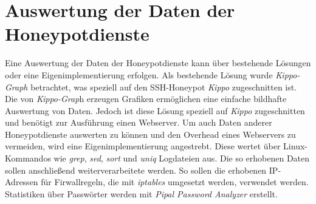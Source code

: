 \section{Auswertung der Daten der Honeypotdienste}
\label{sec:Auswertung der Daten der Honeypotdienste}

Eine Auswertung der Daten der Honeypotdienste kann über bestehende Lösungen oder eine Eigenimplementierung erfolgen. Als bestehende Lösung wurde \textit{Kippo-Graph} betrachtet, was speziell auf den SSH-Honeypot \textit{Kippo} zugeschnitten ist. Die von \textit{Kippo-Grap}h erzeugen Grafiken ermöglichen eine einfache bildhafte Auswertung von Daten. Jedoch ist diese Lösung speziell auf \textit{Kippo} zugeschnitten und benötigt zur Ausführung einen Webserver. Um auch Daten anderer Honeypotdienste auswerten zu können und den Overhead eines Webservers zu vermeiden, wird eine Eigenimplementierung angestrebt. Diese wertet über Linux-Kommandos wie \textit{grep}, \textit{sed}, \textit{sort} und \textit{uniq} Logdateien aus. Die so erhobenen Daten sollen anschließend weiterverarbeitete werden. So sollen die erhobenen IP-Adressen für Firwallregeln, die mit \textit{iptables} umgesetzt werden, verwendet werden. Statistiken über Passwörter werden mit \textit{Pipal Password Analyzer} erstellt.

